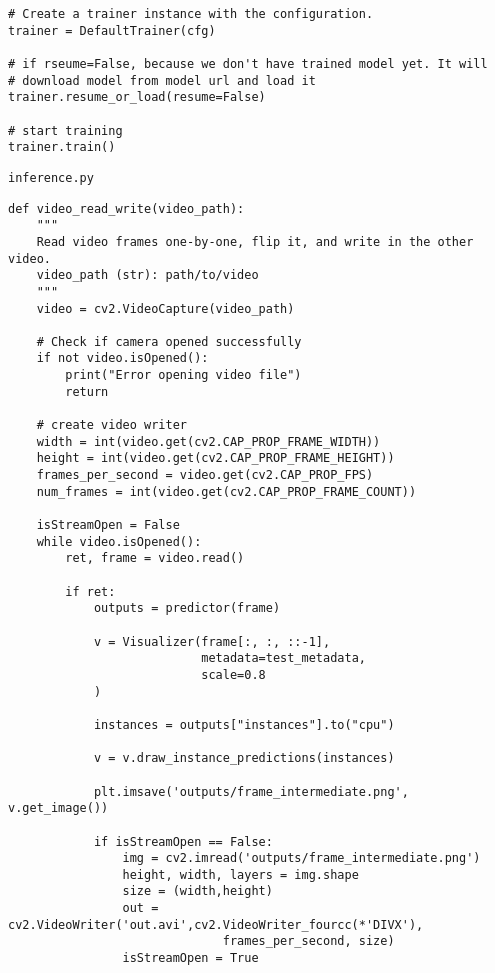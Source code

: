 \begin{verbatim}
# Create a trainer instance with the configuration.
trainer = DefaultTrainer(cfg) 

# if rseume=False, because we don't have trained model yet. It will
# download model from model url and load it
trainer.resume_or_load(resume=False)

# start training
trainer.train()
\end{verbatim}

\clearpage
\begin{verbatim}
inference.py
\end{verbatim}

\label{lst:inferens_retinanet}
\begin{verbatim}
def video_read_write(video_path):
    """
    Read video frames one-by-one, flip it, and write in the other video.
    video_path (str): path/to/video
    """
    video = cv2.VideoCapture(video_path)
    
    # Check if camera opened successfully
    if not video.isOpened(): 
        print("Error opening video file")
        return
    
    # create video writer
    width = int(video.get(cv2.CAP_PROP_FRAME_WIDTH))
    height = int(video.get(cv2.CAP_PROP_FRAME_HEIGHT))
    frames_per_second = video.get(cv2.CAP_PROP_FPS)
    num_frames = int(video.get(cv2.CAP_PROP_FRAME_COUNT))
    
    isStreamOpen = False
    while video.isOpened():
        ret, frame = video.read()
        
        if ret:
            outputs = predictor(frame)

            v = Visualizer(frame[:, :, ::-1],
                           metadata=test_metadata, 
                           scale=0.8
            )

            instances = outputs["instances"].to("cpu")

            v = v.draw_instance_predictions(instances)

            plt.imsave('outputs/frame_intermediate.png', v.get_image())

            if isStreamOpen == False:
                img = cv2.imread('outputs/frame_intermediate.png')
                height, width, layers = img.shape
                size = (width,height)
                out = cv2.VideoWriter('out.avi',cv2.VideoWriter_fourcc(*'DIVX'),
                		      frames_per_second, size)
                isStreamOpen = True


\end{verbatim}
